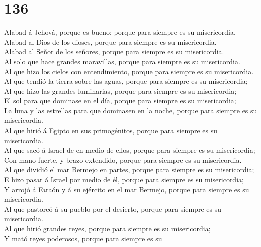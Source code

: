 \hypertarget{section-135}{%
\section{136}\label{section-135}}

 Alabad á Jehová, porque es bueno; porque para siempre es su
misericordia.\\
 Alabad al Dios de los dioses, porque para siempre es su
misericordia.\\
 Alabad al Señor de los señores, porque para siempre es su
misericordia.\\
 Al solo que hace grandes maravillas, porque para siempre es
su misericordia.\\
 Al que hizo los cielos con entendimiento, porque para
siempre es su misericordia.\\
 Al que tendió la tierra sobre las aguas, porque para
siempre es su misericordia;\\
 Al que hizo las grandes luminarias, porque para siempre es
su misericordia;\\
 El sol para que dominase en el día, porque para siempre es
su misericordia;\\
 La luna y las estrellas para que dominasen en la noche,
porque para siempre es su misericordia.\\
 Al que hirió á Egipto en sus primogénitos, porque para
siempre es su misericordia.\\
 Al que sacó á Israel de en medio de ellos, porque para
siempre es su misericordia;\\
 Con mano fuerte, y brazo extendido, porque para siempre es
su misericordia.\\
 Al que dividió el mar Bermejo en partes, porque para
siempre es su misericordia;\\
 E hizo pasar á Israel por medio de él, porque para siempre
es su misericordia;\\
 Y arrojó á Faraón y á su ejército en el mar Bermejo,
porque para siempre es su misericordia.\\
 Al que pastoreó á su pueblo por el desierto, porque para
siempre es su misericordia.\\
 Al que hirió grandes reyes, porque para siempre es su
misericordia;\\
 Y mató reyes poderosos, porque para siempre es su
